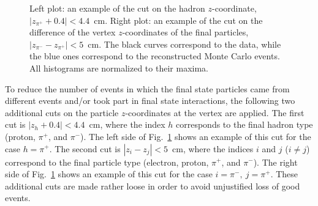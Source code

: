 \begin{figure}[!ht]
\begin{center}
\end{center}
\caption{\small Left plot: an example of the cut on the hadron $z$-coordinate, $|z_{\pi^{+}} + 0.4| < 4.4$~cm. Right plot: an example of the cut on the difference of the vertex $z$-coordinates of the final particles, $|z_{\pi^{-}} - z_{\pi^{+}}| < 5$~cm. The black curves correspond to the data, while the blue ones correspond to the reconstructed Monte Carlo events. All histograms are normalized to their maxima.}
\label{fig:add_cuts_vert}
\end{figure}
\newpage
To reduce the number of events in which the final state particles came from different events and/or took part in final state interactions, the following two additional cuts on the particle $z$-coordinates at the vertex are applied. The first cut is $|z_{h} + 0.4| < 4.4$~cm, where the index $h$ corresponds to the final hadron type (proton, $\pi^{+}$, and $\pi^{-}$). The left side of Fig.~\ref{fig:add_cuts_vert} shows an example of this cut for the case $h=\pi^{+}$. The second cut is $|z_{i} - z_{j}| < 5$~cm, where the indices $i$ and $j$ ($i\neq j$) correspond to the final particle type (electron, proton, $\pi^{+}$, and $\pi^{-}$). The right side of Fig.~\ref{fig:add_cuts_vert} shows an example of this cut for the case $i=\pi^{-},~j=\pi^{+}$. These additional cuts are made rather loose in order to avoid unjustified loss of good events.


